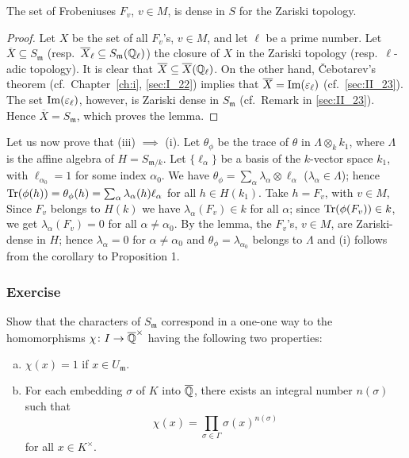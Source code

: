 \begin{lem}
	The set of Frobeniuses $F_v$, $v \in M$, is dense in $S$ for
	the Zariski topology.
\end{lem}
\begin{proof}
Let $X$ be the set of all $F_v$'s, $v \in M$, and let $\ell$ be a prime number.
Let $\overline{X} \subseteq S_{\mathfrak{m}}$ (resp.\ $\overline{X}_\ell
\subseteq S_{\mathfrak{m}}(\mathbb{Q}_\ell)$) the closure of $X$ in the Zariski
topology (resp.\ $\ell$-adic topology). It is clear that
\dpage
$\overline{X} \subseteq \overline{X}(\mathbb{Q}_\ell)$. On the other hand, \v
Cebotarev's theorem (cf.\ Chapter~\ref{ch:i}, \ref{sec:I_22}) implies that
$\overline{X} = \operatorname{Im}(\varepsilon_\ell)$ (cf.\ \ref{sec:II_23}). The set
$\operatorname{Im}(\varepsilon_\ell)$, however, is Zariski dense in $S_{\mathfrak{m}}$ (cf.\ 
Remark in \ref{sec:II_23}). Hence $\overline{X} = S_{\mathfrak{m}}$, which
proves the lemma.
\end{proof}

Let us now prove that (iii) $\implies$ (i). Let $\theta_\phi$ be the trace
of $\theta$ in $\Lambda \otimes_k k_1$, where $\Lambda$ is the affine algebra
of $H = S_{\mathfrak{m} /k}$. Let $\{ \ell_\alpha \}$ be a basis of the
$k$-vector space $k_1$, with $\ell_{\alpha_0} = 1$ for some index $\alpha_0$.
We have $\theta_\phi = \sum_{\alpha} \lambda_\alpha \otimes \ell_\alpha$
($\lambda_\alpha \in \Lambda$); hence $\operatorname{Tr}( \phi(h) ) = \theta_\phi(h) =
\sum_{\alpha} \lambda_\alpha(h) \ell_\alpha$ for all $h \in H(k_1)$. Take $h =
F_v$, with $v \in M$, Since $F_v$ belongs to $H(k)$ we have
$\lambda_\alpha(F_v) \in k$ for all $\alpha$; since $\operatorname{Tr}(\phi(F_v)) \in k$,
we get $\lambda_\alpha(F_v) = 0$ for all $\alpha \ne \alpha_0$. By the lemma,
the $F_v$'s, $v \in M$, are Zariski-dense in $H$; hence $\lambda_\alpha = 0$
for $\alpha \ne \alpha_0$ and $\theta_\phi = \lambda_{\alpha_0}$ belongs to
$\Lambda$ and (i) follows from the corollary to Proposition 1.
\hfill
\qedsymbol

\subsubsection*{Exercise}
Show that the characters of $S_{\mathfrak{m}}$ correspond in a one-one way to
the homomorphisms $\chi \colon I \to \overline{\mathbb{Q}}^\times$ having the following
two properties:
\begin{enumerate}[(a)]
\item $\chi(x) = 1$ if $x \in U_{\mathfrak{m}}$.
\item For each embedding $\sigma$ of $K$ into $\overline{\mathbb{Q}}$, there exists an
	integral number $n(\sigma)$ such that
	\[
		\chi(x) = \prod_{\sigma \in \Gamma} \sigma(x)^{n(\sigma)}
	\]
	for all $x \in K^\times$.
\end{enumerate}

